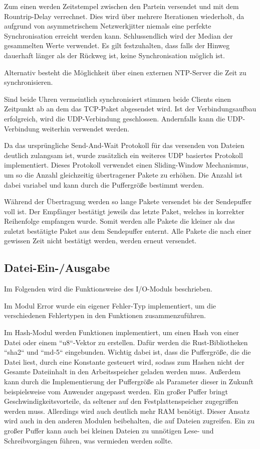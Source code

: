 Zum einen werden Zeitstempel zwischen den Partein versendet und mit dem Rountrip-Delay verrechnet. Dies wird über mehrere Iterationen wiederholt, da aufgrund von asymmetrischem Netzwerkjitter niemals eine perfekte Synchronisation erreicht werden kann. Schlussendlich wird der Median der gesammelten Werte verwendet. Es gilt festzuhalten, dass falls der Hinweg dauerhaft länger als der Rückweg ist, keine Synchronisation möglich ist.

Alternativ besteht die Möglichkeit über einen externen NTP-Server die Zeit zu synchronisieren.

Sind beide Uhren vermeintlich synchronisiert stimmen beide Clients einen Zeitpunkt ab an dem das TCP-Paket abgesendet wird. Ist der Verbindungsaufbau erfolgreich, wird die UDP-Verbindung geschlossen. Andernfalls kann die UDP-Verbindung weiterhin verwendet werden.

Da das ursprüngliche Send-And-Wait Protokoll für das versenden von Dateien deutlich zulangsam ist, wurde zusätzlich ein weiteres UDP basiertes Protokoll implementiert. Dieses Protokoll verwendet einen Sliding-Window Mechanismus, um so die Anzahl gleichzeitig übertragener Pakete zu erhöhen. Die Anzahl ist dabei variabel und kann durch die Puffergröße bestimmt werden.

Während der Übertragung werden so lange Pakete versendet bis der Sendepuffer voll ist. Der Empfänger bestätigt jeweils das letzte Paket, welches in korrekter Reihenfolge empfangen wurde. Somit werden alle Pakete die kleiner als das zuletzt bestätigte Paket aus dem Sendepuffer enternt. Alle Pakete die nach einer gewissen Zeit nicht bestätigt werden, werden erneut versendet.

\subsection{Datei-Ein-/Ausgabe}
Im Folgenden wird die Funktionsweise des I/O-Moduls beschrieben.

Im Modul Error wurde ein eigener Fehler-Typ implementiert, um die verschiedenen Fehlertypen in den Funktionen zusammenzuführen.

Im Hash-Modul werden Funktionen implementiert, um einen Hash von einer Datei oder einem “u8“-Vektor zu erstellen. Dafür werden die Rust-Bibliotheken “sha2“ und “md-5“ eingebunden. 
Wichtig dabei ist, dass die Puffergröße, die die Datei liest, durch eine Konstante gesteuert wird, sodass zum Hashen nicht der Gesamte Dateiinhalt in den Arbeitsspeicher geladen werden muss.
Außerdem kann durch die Implementierung der Puffergröße als Parameter dieser in Zukunft beispielsweise vom Anwender angepasst werden. Ein großer Puffer bringt Geschwindigkeitsvorteile, da seltener auf den Festplattenspeicher zugegriffen werden muss. Allerdings wird auch deutlich mehr RAM benötigt. Dieser Ansatz wird auch in den anderen Modulen beibehalten, die auf Dateien zugreifen. Ein zu großer Puffer kann auch bei kleinen Dateien zu unnötigen Lese- und Schreibvorgängen führen, was vermieden werden sollte.

